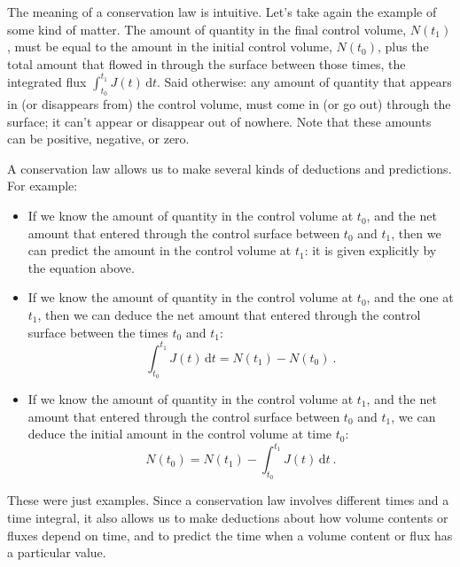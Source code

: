 \documentclass[a4paper,12pt,%
onecolumn,oneside,%
british%
]{memoir}
\newcommand*{\di}{\mathrm{d}}%
\renewcommand*{\|}[1][]{\nonscript\:#1\vert\nonscript\:\mathopen{}}
\newcommand*{\yti}{t_{0}}
\newcommand*{\ytf}{t_{1}}
\newcommand*{\dt}{\di t}
\newcommand*{\yN}{N}
\newcommand*{\yJ}{J}
\begin{document}
The meaning of a conservation law is intuitive. Let's take again the example of some kind of matter. The amount of quantity in the final control volume, $\yN(\ytf)$, must be equal to the amount in the initial control volume, $\yN(\yti)$, plus the total amount that flowed in through the surface between those times, the integrated flux $\int_{\yti}^{\ytf}\!\!\yJ(t)\, \dt$. Said otherwise: any amount of quantity that appears in (or disappears from) the control volume, must come in (or go out) through the surface; it can't appear or disappear out of nowhere. Note that these amounts can be positive, negative, or zero.

A conservation law allows us to make several kinds of deductions and predictions. For example:
\begin{itemize}
\item If we know the amount of quantity in the control volume at $\yti$, and the net amount that entered through the control surface between $\yti$ and $\ytf$, then we can predict the amount in the control volume at $\ytf$: it is given explicitly by the equation above.

\item If we know the amount of quantity in the control volume at $\yti$, and the one at $\ytf$, then we can deduce the net amount that entered through the control surface between the times $\yti$ and $\ytf$:
  \begin{equation*}
    \int_{\yti}^{\ytf}\!\!\yJ(t)\, \dt = \yN(\ytf) - \yN(\yti) \ .
  \end{equation*}

\item If we know the amount of quantity in the control volume at $\ytf$, and the net amount that entered through the control surface between $\yti$ and $\ytf$, we can deduce the initial amount in the control volume at time $\yti$:
  \begin{equation*}
    \yN(\yti) = \yN(\ytf) - \int_{\yti}^{\ytf}\!\!\yJ(t)\, \dt \ .
  \end{equation*}
\end{itemize}

These were just examples. Since a conservation law involves different times and a time integral, it also allows us to make deductions about how volume contents or fluxes depend on time, and to predict the time when a volume content or flux has a particular value.
\end{document}
